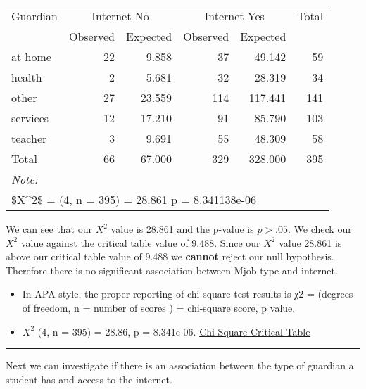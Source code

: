 \documentclass[
]{book}
\providecommand{\tightlist}{%
  \setlength{\itemsep}{0pt}\setlength{\parskip}{0pt}}
\theoremstyle{definition}
\theoremstyle{definition}
\theoremstyle{definition}
\theoremstyle{definition}
\theoremstyle{remark}
\begin{document}
\begin{table}
\centering
\begin{tabular}{l|r|r|r|r|r}
\hline
\multicolumn{1}{c|}{Guardian} & \multicolumn{2}{c|}{Internet No} & \multicolumn{2}{c|}{Internet Yes} & \multicolumn{1}{c}{Total} \\
\cline{1-1} \cline{2-3} \cline{4-5} \cline{6-6}
  & Observed & Expected & Observed & Expected & \\
\hline
at home & 22 & 9.858 & 37 & 49.142 & 59\\
\hline
health & 2 & 5.681 & 32 & 28.319 & 34\\
\hline
other & 27 & 23.559 & 114 & 117.441 & 141\\
\hline
services & 12 & 17.210 & 91 & 85.790 & 103\\
\hline
teacher & 3 & 9.691 & 55 & 48.309 & 58\\
\hline
Total & 66 & 67.000 & 329 & 328.000 & 395\\
\hline
\multicolumn{6}{l}{\rule{0pt}{1em}\textit{Note: }}\\
\multicolumn{6}{l}{\rule{0pt}{1em}\$X\textasciicircum{}2\$ = (4, n = 395) = 28.861 p = 8.341138e-06}\\
\end{tabular}
\end{table}

We can see that our \(X^2\) value is 28.861 and the p-value is \(p>.05\). We check our \(X^2\) value against the critical table value of 9.488. Since our \(X^2\) value 28.861 is above our critical table value of 9.488 we \textbf{cannot} reject our null hypothesis. Therefore there is no significant association between Mjob type and internet.

\begin{itemize}
\tightlist
\item
  In APA style, the proper reporting of chi-square test results is χ2 = (degrees of freedom, n = number of scores ) = chi-square score, p value.
\item
  \(X^2\) (4, n = 395) = 28.86, p = 8.341e-06.
  \href{https://www.itl.nist.gov/div898/handbook/eda/section3/eda3674.htm}{Chi-Square Critical Table}
\end{itemize}

\begin{center}\rule{0.5\linewidth}{0.5pt}\end{center}

Next we can investigate if there is an association between the type of guardian a student has and access to the internet.
\end{document}
